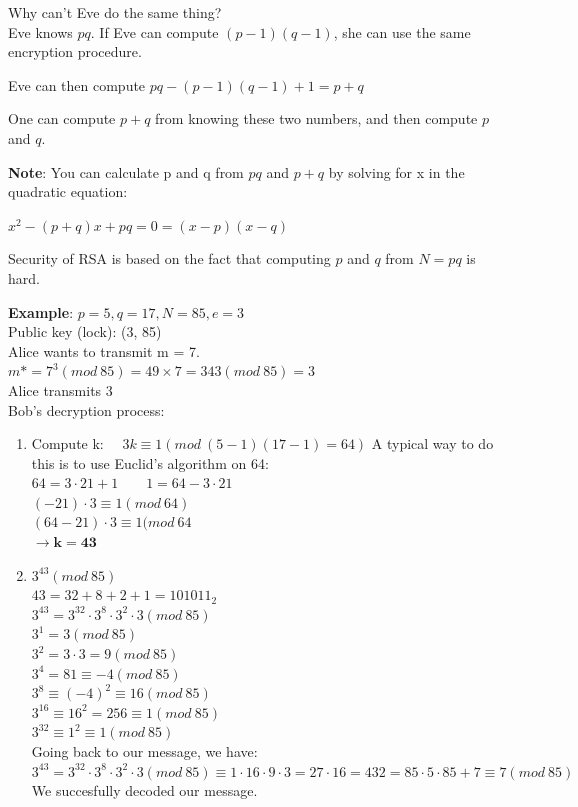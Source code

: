 \documentclass[9pt, letterpaper, oneside]{article}
\begin{document}
Why can't Eve do the same thing?\\
Eve knows $pq$. If Eve can compute $(p-1)(q-1)$, she can use the same encryption procedure.

Eve can then compute $pq - (p-1)(q-1) + 1 = p + q$

One can compute $p + q$ from knowing these two numbers, and then compute $p$ and $q$.

\textbf{Note}: You can calculate p and q from $pq$ and $p + q$ by solving for x in the quadratic equation:

$x^2 - (p+q)x + pq = 0 = (x - p)(x- q)$

Security of RSA is based on the fact that computing $p$ and $q$ from $N = pq$ is hard.


\textbf{Example}: 
$p = 5, q = 17, N = 85, e = 3$\\
Public key (lock): (3, 85)\\
Alice wants to transmit m = 7.\\
$m* = 7^3 (mod \ 85) = 49 \times 7 = 343 (mod \ 85) = 3$\\
Alice transmits 3\\
Bob's decryption process:\\
\begin{enumerate}
\item Compute k: $\quad 3k \equiv 1 (mod \ (5 - 1)(17 - 1) = 64)$
A typical way to do this is to use Euclid's algorithm on 64:\\
$64 = 3 \cdot 21 + 1 \qquad 1 = 64 - 3 \cdot 21$\\
$(-21) \cdot 3 \equiv 1 (mod \ 64)$\\
$(64 - 21) \cdot 3 \equiv 1 (mod \ 64$\\
$\to \mathbf{k = 43}$
\item $3^{43} (mod \ 85)$\\
$43 = 32 + 8 + 2 + 1 = 101011_2$\\
$3^{43} = 3^{32} \cdot 3^8 \cdot 3^2 \cdot 3 (mod \ 85) $\\
$3^1 = 3 (mod \ 85)$\\
$3^2 = 3 \cdot 3 =  9 (mod \ 85)$\\
$3^4 = 81 \equiv -4 (mod \ 85)$\\
$3^8 \equiv (-4)^2 \equiv 16 (mod \ 85)$\\
$3^{16} \equiv 16^2 = 256 \equiv 1 (mod \ 85)$\\
$3^{32} \equiv 1^2 \equiv 1 (mod \ 85)$\\
Going back to our message, we have:\\
$3^{43} = 3^{32} \cdot 3^8 \cdot 3^2 \cdot 3 (mod \ 85) \equiv 1 \cdot 16 \cdot 9 \cdot 3 = 27 \cdot 16 = 432 = 85 \cdot 5 \cdot 85 + 7 \equiv 7 (mod \ 85)$\\
We succesfully decoded our message.
\end{enumerate}
\end{document}
